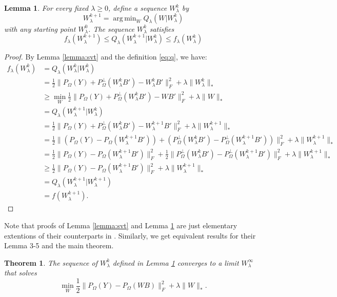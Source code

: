 \documentclass[preprint]{imsart}
\numberwithin{equation}{section}
\theoremstyle{plain}
\newtheorem{theorem}{Theorem}
\newtheorem{lemma}{Lemma}
\DeclareMathOperator*{\argmin}{arg\,min}
\begin{document}
\begin{lemma}\label{eq:z-sequence}
For every fixed $\lambda \geq 0$, define a sequence $W_\lambda^k$ by
\[
W_\lambda^{k+1} = \argmin_W Q_\lambda(W|W_\lambda^k)
\]
with any starting point $W_\lambda^0$. The sequence $W_\lambda^k$ satisfies 
\[
f_\lambda(W_\lambda^{k+1}) \leq  Q_\lambda(W_\lambda^{k+1} | W_\lambda^k ) \leq f_\lambda(W_\lambda^{k})
\]
\end{lemma}
\begin{proof}
By Lemma \ref{lemma:svt} and the definition \eqref{eq:q}, we have:
\begin{align*}
  f_\lambda(W_\lambda^k) &= Q_\lambda(W_\lambda^k | W_\lambda^k)\\
  &= \frac{1}{2}\|P_{\Omega}(Y) + P_{\Omega}^{\perp}(W_\lambda^k B') - W_\lambda^kB'\|_F^2 + \lambda \|W_\lambda^k\|_*\\
  &\geq \min_W \frac{1}{2}\|P_{\Omega}(Y) + P_{\Omega}^{\perp}(W_\lambda^k B') - WB'\|_F^2 + \lambda \|W\|_*\\
  &= Q_\lambda(W_\lambda^{k+1} | W_\lambda^k)\\
  &= \frac{1}{2}\|P_{\Omega}(Y) + P_{\Omega}^{\perp}(W_\lambda^k B') - W_\lambda^{k+1}B'\|_F^2 + \lambda \|W_\lambda^{k+1}\|_*\\
  &= \frac{1}{2}\|(P_{\Omega}(Y) - P_\Omega(W_\lambda^{k+1}B'))+ (P_{\Omega}^{\perp}(W_\lambda^k B') - P_\Omega^\perp(W_\lambda^{k+1}B'))\|_F^2 + \lambda \|W_\lambda^{k+1}\|_*\\
  &= \frac{1}{2}\|P_{\Omega}(Y) - P_\Omega(W_\lambda^{k+1}B')\|_F^2 + \frac{1}{2}\|P_{\Omega}^{\perp}(W_\lambda^k B') - P_\Omega^\perp(W_\lambda^{k+1}B')\|_F^2 + \lambda \|W_\lambda^{k+1}\|_*\\
  &\geq \frac{1}{2}\|P_{\Omega}(Y) - P_\Omega(W_\lambda^{k+1}B')\|_F^2 + \lambda \|W_\lambda^{k+1}\|_*\\
  &= Q_\lambda(W_\lambda^{k+1} | W_\lambda^{k+1})\\
  &= f(W_\lambda^{k+1}).
\end{align*}
\end{proof}
    Note that proofs of Lemma \ref{lemma:svt} and Lemma \ref{eq:z-sequence} are just elementary extentions of their counterparts in \citet{mazumder2010spectral}. Similarly, we get equivalent results for their Lemma 3-5 and the main theorem.
\begin{theorem}
The sequence of $W_{\lambda}^k$ defined in Lemma \ref{eq:z-sequence} converges to a limit $W_\lambda^\infty$ that solves
\[
\min_W \frac{1}{2} \|P_\Omega(Y) - P_\Omega(WB)\|_F^2 + \lambda\|W\|_*.
\]
\end{theorem}
\end{document}

